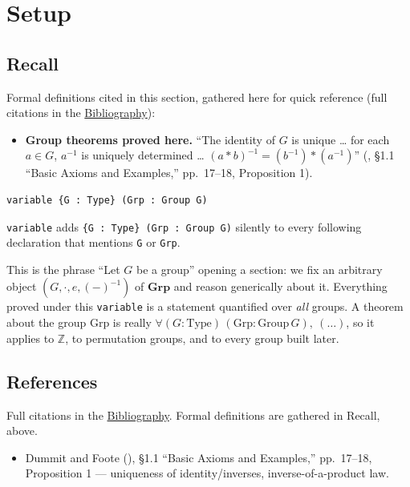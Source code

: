 \section{Setup}\label{sec:07-group-theorems:01-setup:1}

\subsection{Recall}\label{sec:07-group-theorems:01-setup:2}

Formal definitions cited in this section, gathered here for quick reference (full citations in the \hyperref[sec:root:bibliography:1]{Bibliography}):

\begin{itemize}
\tightlist
\item
  \textbf{Group theorems proved here.} ``The identity of \(G\) is unique \ldots{} for each \(a \in G\), \(a^{-1}\) is uniquely determined \ldots{} \((a{*}b)^{-1} = (b^{-1}){*}(a^{-1})\)'' (\cite{DummitFoote2003}, §1.1 ``Basic Axioms and Examples,'' pp.~17--18, Proposition 1).
\end{itemize}

\begin{lstlisting}
variable {G : Type} (Grp : Group G)
\end{lstlisting}

\texttt{variable} adds \texttt{\{G : Type\} (Grp : Group G)} silently to every following declaration that mentions \texttt{G} or \texttt{Grp}.

\begin{mathreading}

This is the phrase ``Let \(G\) be a group'' opening a section: we fix an arbitrary object \((G, \cdot, e, (-)^{-1})\) of \(\mathbf{Grp}\) and reason generically about it. Everything proved under this \texttt{variable} is a statement quantified over \emph{all} groups. A theorem about the group \(\mathrm{Grp}\) is really \(\forall (G : \mathrm{Type})\,(\mathrm{Grp} :
\mathrm{Group}\,G),\ (\ldots)\), so it applies to \(\mathbb{Z}\), to permutation groups, and to every group built later.

\end{mathreading}

\subsection{References}\label{sec:07-group-theorems:01-setup:3}

Full citations in the \hyperref[sec:root:bibliography:1]{Bibliography}. Formal definitions are gathered in Recall, above.

\begin{itemize}
\tightlist
\item
  Dummit and Foote (\cite{DummitFoote2003}), §1.1 ``Basic Axioms and Examples,'' pp.~17--18, Proposition 1 --- uniqueness of identity/inverses, inverse-of-a-product law.
\end{itemize}
